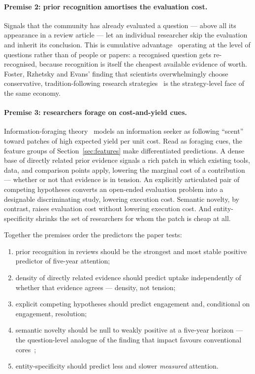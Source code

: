 \documentclass[11pt]{article}
\begin{document}
\paragraph{Premise 2: prior recognition amortises the evaluation cost.}
Signals that the community has already evaluated a question --- above all
its appearance in a review article --- let an individual researcher skip
the evaluation and inherit its conclusion. This is cumulative
advantage~\cite{merton1968} operating at the level of questions rather
than of people or papers: a recognised question gets re-recognised,
because recognition is itself the cheapest available evidence of worth.
Foster, Rzhetsky and Evans' finding that scientists overwhelmingly choose
conservative, tradition-following research strategies~\cite{foster2015} is
the strategy-level face of the same economy.

\paragraph{Premise 3: researchers forage on cost-and-yield cues.}
Information-foraging theory~\cite{pirolli1999} models an information
seeker as following ``scent'' toward patches of high expected yield per
unit cost. Read as foraging cues, the feature groups of
Section~\ref{sec:features} make differentiated predictions. A dense base
of directly related prior evidence signals a rich patch in which existing
tools, data, and comparison points apply, lowering the marginal cost of a
contribution --- whether or not that evidence is in tension. An explicitly
articulated pair of competing hypotheses converts an open-ended evaluation
problem into a designable discriminating study, lowering execution cost.
Semantic novelty, by contrast, raises evaluation cost without lowering
execution cost. And entity-specificity shrinks the set of researchers for
whom the patch is cheap at all.

\medskip
\noindent Together the premises order the predictors the paper tests:

\begin{enumerate}[label=(P\arabic*)]
  \item prior recognition in reviews should be the strongest and most
    stable positive predictor of five-year attention;
  \item density of directly related evidence should predict uptake
    independently of whether that evidence agrees --- density, not
    tension;
  \item explicit competing hypotheses should predict engagement and,
    conditional on engagement, resolution;
  \item semantic novelty should be null to weakly positive at a five-year
    horizon --- the question-level analogue of the finding that impact
    favours conventional cores~\cite{uzzi2013};
  \item entity-specificity should predict less and slower
    \emph{measured} attention.
\end{enumerate}
\end{document}
